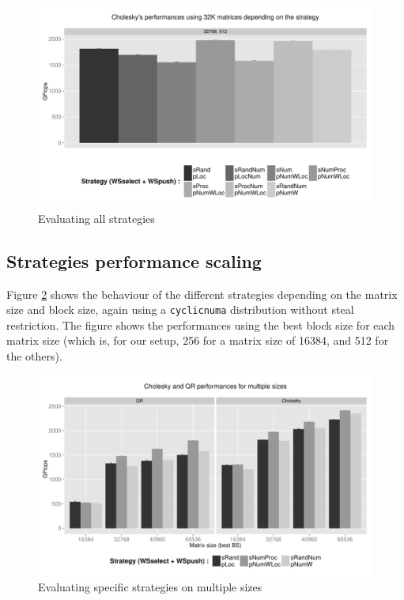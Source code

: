 \documentclass{Styles/llncs}
\begin{document}
\begin{figure}[t]
  \centering
  \includegraphics[scale=0.5]{figures/graph_all_strat.pdf}
\caption{Evaluating all strategies}
\label{fig:eval-all-strat}
\end{figure}


\subsection{Strategies performance scaling}

Figure \ref{fig:eval-strat-sizes} shows the behaviour of the different strategies
depending on the matrix size and block size, again using a \verb/cyclicnuma/ distribution
without steal restriction. The figure shows the performances using
the best block size for each matrix size (which is, for our setup, 256 for a matrix
size of 16384, and 512 for the others).

\begin{figure}[t]
  \centering
  \includegraphics[scale=0.5]{figures/graph_details_strat.pdf}
\caption{Evaluating specific strategies on multiple sizes}
\label{fig:eval-strat-sizes}
\end{figure}
\end{document}
